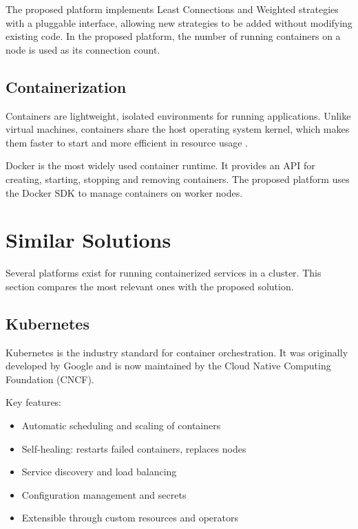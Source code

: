 The proposed platform implements Least Connections and Weighted strategies with a pluggable interface, allowing new strategies to be added without modifying existing code. In the proposed platform, the number of running containers on a node is used as its connection count.

\subsection{Containerization}

Containers are lightweight, isolated environments for running applications. Unlike virtual machines, containers share the host operating system kernel, which makes them faster to start and more efficient in resource usage \cite{misc:web:docker:overview}.

Docker is the most widely used container runtime. It provides an API for creating, starting, stopping and removing containers. The proposed platform uses the Docker SDK to manage containers on worker nodes.

\section{Similar Solutions}

Several platforms exist for running containerized services in a cluster. This section compares the most relevant ones with the proposed solution.

\subsection{Kubernetes}

Kubernetes \cite{misc:web:kubernetes} is the industry standard for container orchestration. It was originally developed by Google and is now maintained by the Cloud Native Computing Foundation (CNCF).

Key features:
\begin{itemize}
    \item Automatic scheduling and scaling of containers
    \item Self-healing: restarts failed containers, replaces nodes
    \item Service discovery and load balancing
    \item Configuration management and secrets
    \item Extensible through custom resources and operators
\end{itemize}

